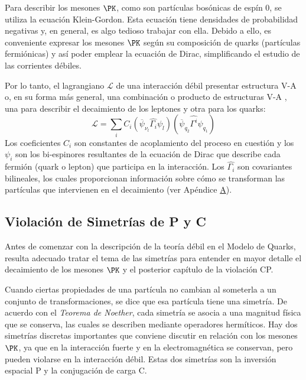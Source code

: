 Para describir los mesones $\PK$, como son partículas bosónicas de espín 0, se utiliza la ecuación Klein-Gordon. Esta ecuación tiene densidades de probabilidad negativas y, en general, es algo tedioso trabajar con ella. Debido a ello, es conveniente expresar los mesones $\PK$ según su composición de quarks (partículas fermiónicas) y así poder emplear la ecuación de Dirac, simplificando el estudio de las corrientes débiles.

Por lo tanto, el lagrangiano $\mathcal{L}$ de una interacción débil presentar estructura V-A o, en su forma más general, una combinación o producto de estructuras V-A \cite{Renton}, una para describir el decaimiento de los leptones y otra para los quarks:
\begin{equation}
\mathcal{L}= \sum _{i} C_{i}\left( \overline{\psi}_{\nu_l}\widehat{\Gamma_{i}}\psi _{l}\right)\left( \overline{\psi }_{q_2}\widehat{\Gamma^{i}}\psi _{q_1}\right)
\end{equation}
Los coeficientes $C_i$ son constantes de acoplamiento del proceso en cuestión y los $\psi_i$ son los bi-espinores resultantes de la ecuación de Dirac que describe cada fermión (quark o lepton) que participa en la interacción. Los $\widehat{\Gamma_{i}}$ son covariantes bilineales, los cuales proporcionan información sobre cómo se transforman las partículas que intervienen en el decaimiento (ver Apéndice \hyperref[cap:A]{A}).

\subsection{Violación de Simetrías de P y C}\label{sec:symmetry}
Antes de comenzar con la descripción de la teoría débil en el Modelo de Quarks, resulta adecuado tratar el tema de las simetrías para entender en mayor detalle el decaimiento de los mesones $\PK$ y el posterior capítulo de la violación CP.

Cuando ciertas propiedades de una partícula no cambian al someterla a un conjunto de transformaciones, se dice que esa partícula tiene una simetría. De acuerdo con el \textit{Teorema de Noether}, cada simetría se asocia a una magnitud física que se conserva, las cuales se describen mediante operadores hermíticos. Hay dos simetrías discretas importantes que conviene discutir en relación con los mesones $\PK$, ya que en la interacción fuerte y en la electromagnética se conservan, pero pueden violarse en la interacción débil. Estas dos simetrías son la inversión espacial P y la conjugación de carga C.

